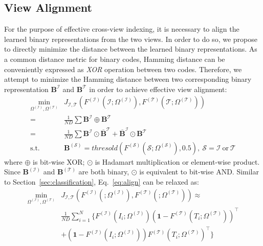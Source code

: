 \documentclass[10pt,twocolumn,letterpaper]{article}
\begin{document}
\subsection{View Alignment}
For the purpose of effective cross-view indexing, it is necessary to align the learned binary representations from the two views. In order to do so, we propose to directly minimize the distance between the learned binary representations. As a common distance metric for binary codes, Hamming distance can be conveniently expressed as \textit{XOR} operation between two codes. Therefore, we attempt to minimize the Hamming distance between two corresponding binary representation $\mathbf{B}^{\mathcal{I}}$ and $\mathbf{B}^{\mathcal{T}}$ in order to achieve effective view alignment:
\begin{align}\label{eq:align}
\min_{\Omega^{(\mathcal{I})},\Omega^{(\mathcal{T})}}& \mathit{J}_{\mathcal{I},\mathcal{T}}(F^{(\mathcal{I})}(\mathcal{I};\Omega^{(\mathcal{I})}),F^{(\mathcal{T})}(\mathcal{T};\Omega^{(\mathcal{T})}))\\ \nonumber
=& \frac{1}{ND}\sum\mathbf{B}^{\mathcal{I}}\oplus \mathbf{B}^{\mathcal{T}}\\ \nonumber
=&\frac{1}{ND}\sum  \mathbf{B}^{\mathcal{I}}\odot\overline{\mathbf{B}}^{\mathcal{T}}+\overline{\mathbf{B}}^{\mathcal{I}}\odot\mathbf{B}^{\mathcal{T}}\\
\text{s.t.}\;& \mathbf{B}^{(\mathcal{S})} = thresold(F^{(\mathcal{S})}(\mathcal{S};\Omega^{(\mathcal{S})}),0.5),\ \mathcal{S} = \mathcal{I}\ \text{or}\ \mathcal{T}\nonumber
\end{align}
where $\oplus$ is bit-wise XOR; $\odot$ is Hadamart multiplication or element-wise product. Since $\mathbf{B}^{(\mathcal{I})}$ and $\mathbf{B}^{(\mathcal{T})}$ are both binary, $\odot$ is equivalent to bit-wise AND.
Similar to Section~\ref{sec:classification}, Eq.~\ref{eq:align} can be relaxed as:
\begin{align}
\min_{\Omega^{(\mathcal{I})},\Omega^{(\mathcal{T})}}& \mathit{J}_{\mathcal{I},\mathcal{T}}(F^{(\mathcal{I})}(;\Omega^{(\mathcal{I})}),F^{(\mathcal{T})}(;\Omega^{(\mathcal{T})}))\approx\\ \nonumber
 & \frac{1}{ND} \sum_{i=1}^N \Big\{F^{(\mathcal{I})}(I_i;\Omega^{(\mathcal{I})})(\mathbf{1}-F^{(\mathcal{T})}(T_i;\Omega^{(\mathcal{T})}))^\top\\ \nonumber
&+(\mathbf{1}-F^{(\mathcal{I})}(I_i;\Omega^{(\mathcal{I})}))F^{(\mathcal{T})}(T_i;\Omega^{(\mathcal{T})})^\top\Big\}
\end{align}
\end{document}
